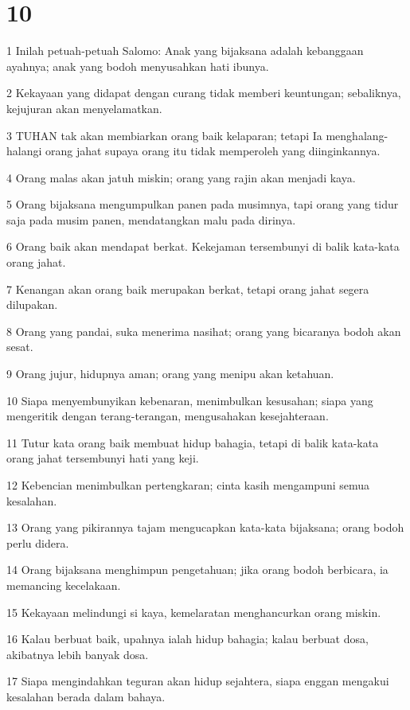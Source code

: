 \chapter{10}

\par 1 Inilah petuah-petuah Salomo: Anak yang bijaksana adalah kebanggaan ayahnya; anak yang bodoh menyusahkan hati ibunya.
\par 2 Kekayaan yang didapat dengan curang tidak memberi keuntungan; sebaliknya, kejujuran akan menyelamatkan.
\par 3 TUHAN tak akan membiarkan orang baik kelaparan; tetapi Ia menghalang-halangi orang jahat supaya orang itu tidak memperoleh yang diinginkannya.
\par 4 Orang malas akan jatuh miskin; orang yang rajin akan menjadi kaya.
\par 5 Orang bijaksana mengumpulkan panen pada musimnya, tapi orang yang tidur saja pada musim panen, mendatangkan malu pada dirinya.
\par 6 Orang baik akan mendapat berkat. Kekejaman tersembunyi di balik kata-kata orang jahat.
\par 7 Kenangan akan orang baik merupakan berkat, tetapi orang jahat segera dilupakan.
\par 8 Orang yang pandai, suka menerima nasihat; orang yang bicaranya bodoh akan sesat.
\par 9 Orang jujur, hidupnya aman; orang yang menipu akan ketahuan.
\par 10 Siapa menyembunyikan kebenaran, menimbulkan kesusahan; siapa yang mengeritik dengan terang-terangan, mengusahakan kesejahteraan.
\par 11 Tutur kata orang baik membuat hidup bahagia, tetapi di balik kata-kata orang jahat tersembunyi hati yang keji.
\par 12 Kebencian menimbulkan pertengkaran; cinta kasih mengampuni semua kesalahan.
\par 13 Orang yang pikirannya tajam mengucapkan kata-kata bijaksana; orang bodoh perlu didera.
\par 14 Orang bijaksana menghimpun pengetahuan; jika orang bodoh berbicara, ia memancing kecelakaan.
\par 15 Kekayaan melindungi si kaya, kemelaratan menghancurkan orang miskin.
\par 16 Kalau berbuat baik, upahnya ialah hidup bahagia; kalau berbuat dosa, akibatnya lebih banyak dosa.
\par 17 Siapa mengindahkan teguran akan hidup sejahtera, siapa enggan mengakui kesalahan berada dalam bahaya.
